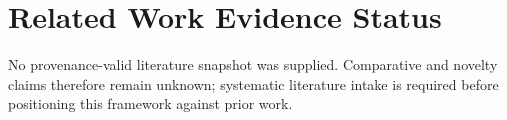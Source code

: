 \section{Related Work Evidence Status}

No provenance-valid literature snapshot was supplied. Comparative and novelty claims therefore remain unknown; systematic literature intake is required before positioning this framework against prior work.
